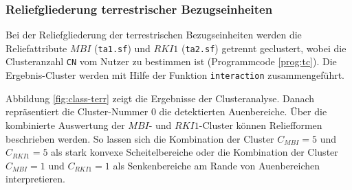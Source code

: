 \subsubsection{Reliefgliederung terrestrischer Bezugseinheiten}\label{sec:ext-sf}
Bei der Reliefgliederung der terrestrischen Bezugseinheiten werden die Reliefattribute $MBI$ (\texttt{ta1.sf}) und $RKI1$ (\texttt{ta2.sf}) getrennt geclustert, wobei die Clusteranzahl \texttt{CN} vom Nutzer zu bestimmen ist (Programmcode \ref{prog:tc}). Die Ergebnis-Cluster werden mit Hilfe der Funktion \texttt{interaction} zusammengeführt.\ 

Abbildung \ref{fig:class-terr} zeigt die Ergebnisse der Clusteranalyse. Danach repräsentiert die Cluster-Nummer 0 die detektierten Auenbereiche. Über die kombinierte Auswertung der $MBI$- und $RKI1$-Cluster können Reliefformen beschrieben werden. So lassen sich die Kombination der Cluster $C_{MBI}=5$ und $C_{RKI1}=5$ als stark konvexe Scheitelbereiche oder die Kombination der Cluster $C_{MBI}=1$ und $C_{RKI1}=1$ als Senkenbereiche am Rande von Auenbereichen interpretieren.

